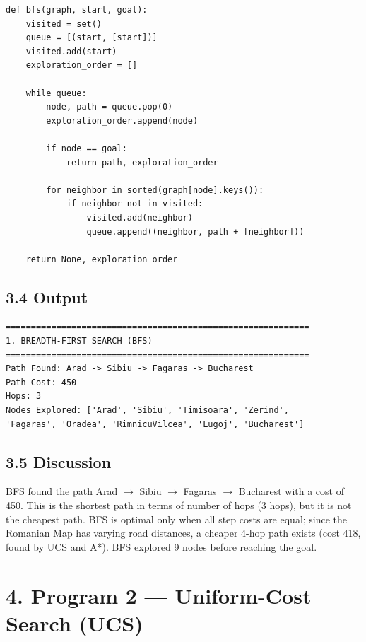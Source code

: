 \documentclass[12pt,a4paper]{article}
\begin{document}
\begin{lstlisting}[style=plain, caption={Breadth-First Search}]
def bfs(graph, start, goal):
    visited = set()
    queue = [(start, [start])]
    visited.add(start)
    exploration_order = []

    while queue:
        node, path = queue.pop(0)
        exploration_order.append(node)

        if node == goal:
            return path, exploration_order

        for neighbor in sorted(graph[node].keys()):
            if neighbor not in visited:
                visited.add(neighbor)
                queue.append((neighbor, path + [neighbor]))

    return None, exploration_order
\end{lstlisting}

\subsection*{3.4 Output}

\begin{verbatim}
============================================================
1. BREADTH-FIRST SEARCH (BFS)
============================================================
Path Found: Arad -> Sibiu -> Fagaras -> Bucharest
Path Cost: 450
Hops: 3
Nodes Explored: ['Arad', 'Sibiu', 'Timisoara', 'Zerind',
'Fagaras', 'Oradea', 'RimnicuVilcea', 'Lugoj', 'Bucharest']
\end{verbatim}

\subsection*{3.5 Discussion}

BFS found the path Arad $\rightarrow$ Sibiu $\rightarrow$ Fagaras $\rightarrow$ Bucharest with a cost of 450. This is the shortest path in terms of number of hops (3 hops), but it is not the cheapest path. BFS is optimal only when all step costs are equal; since the Romanian Map has varying road distances, a cheaper 4-hop path exists (cost 418, found by UCS and A*). BFS explored 9 nodes before reaching the goal.

\section*{4. Program 2 --- Uniform-Cost Search (UCS)}
\end{document}
